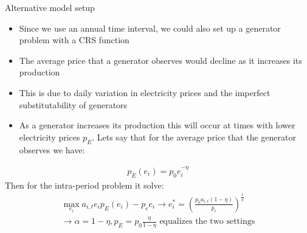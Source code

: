 \documentclass{beamer}
\begin{document}


\begin{frame}{Alternative model setup}\label{alt_model}
\small 
\begin{itemize}
    \item Since we use an annual time interval, we could also set up a generator problem with a CRS function
    \item The average price that a generator observes would decline as it increases its production
    \item This is due to daily variation in electricity prices and the imperfect substitutability of generators
    \item As a generator increases its production this will occur at times with lower electricity prices $p_E$. Lets say that for the average price that the generator observes we have:
\end{itemize}   
    \small\begin{align*}
        p_E(e_i) = p_0e_i^{-\eta}
    \end{align*}
    \small Then for the intra-period problem it solve:
    \small\begin{align*}
        \max_{e_i} a_{i,t}e_ip_E(e_i) - p_ee_i \rightarrow e_i^* = (\frac{p_0a_{i,t}(1-\eta)}{p_e})^\frac{1}{\eta} \\\rightarrow \alpha = 1-\eta , p_E = p_0\frac{\eta}{1-\eta} \text{ equalizes the two settings}
    \end{align*}
    \hyperlink{gen_problem}{}   
\end{frame}
\end{document}
